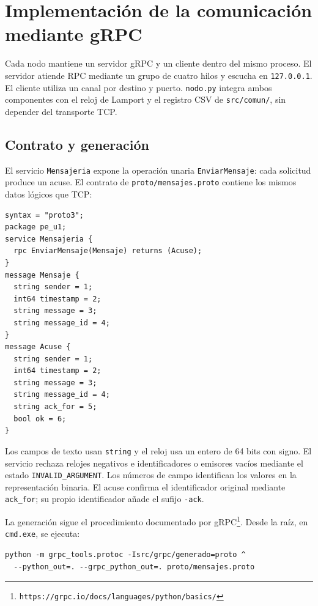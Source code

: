 \section{Implementación de la comunicación mediante gRPC}
\label{sec:grpc}

Cada nodo mantiene un servidor gRPC y un cliente dentro del mismo proceso.
El servidor atiende RPC mediante un grupo de cuatro hilos y escucha en
\texttt{127.0.0.1}. El cliente utiliza un canal por destino y puerto.
\texttt{nodo.py} integra ambos componentes con el reloj de Lamport y el
registro CSV de \texttt{src/comun/}, sin depender del transporte TCP.

\subsection{Contrato y generación}

El servicio \texttt{Mensajeria} expone la operación unaria
\texttt{EnviarMensaje}: cada solicitud produce un acuse. El contrato
de \texttt{proto/mensajes.proto} contiene los mismos datos lógicos que TCP:

\begin{verbatim}
syntax = "proto3";
package pe_u1;
service Mensajeria {
  rpc EnviarMensaje(Mensaje) returns (Acuse);
}
message Mensaje {
  string sender = 1;
  int64 timestamp = 2;
  string message = 3;
  string message_id = 4;
}
message Acuse {
  string sender = 1;
  int64 timestamp = 2;
  string message = 3;
  string message_id = 4;
  string ack_for = 5;
  bool ok = 6;
}
\end{verbatim}

Los campos de texto usan \texttt{string} y el reloj usa un entero de
64 bits con signo. El servicio rechaza relojes negativos e identificadores
o emisores vacíos mediante el estado \texttt{INVALID\_ARGUMENT}. Los números
de campo identifican los valores en la representación binaria. El acuse
confirma el identificador original mediante \texttt{ack\_for}; su propio
identificador añade el sufijo \texttt{-ack}.

La generación sigue el procedimiento documentado por
gRPC\footnote{\texttt{https://grpc.io/docs/languages/python/basics/}}.
Desde la raíz, en \texttt{cmd.exe}, se ejecuta:

\begin{verbatim}
python -m grpc_tools.protoc -Isrc/grpc/generado=proto ^
  --python_out=. --grpc_python_out=. proto/mensajes.proto
\end{verbatim}

